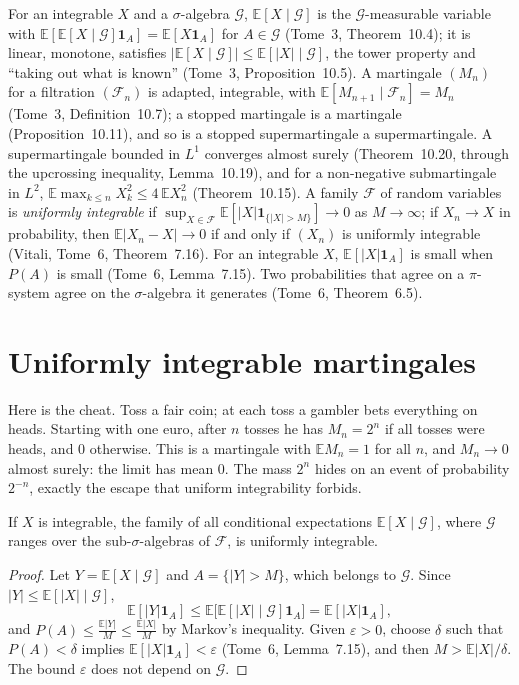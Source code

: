 \begin{reminder}
For an integrable $X$ and a $\sigma$-algebra $\mathcal G$, $\mathbb E[X\mid\mathcal G]$ is the $\mathcal G$-measurable variable with $\mathbb E[\mathbb E[X\mid\mathcal G]\mathbf 1_A]=\mathbb E[X\mathbf 1_A]$ for $A\in\mathcal G$
(Tome~3, Theorem~10.4); it is linear, monotone, satisfies $|\mathbb E[X\mid\mathcal G]|\le\mathbb E[|X|\mid\mathcal G]$, the tower property and ``taking out what is known''
(Tome~3, Proposition~10.5). A martingale $(M_n)$ for a filtration $(\mathcal F_n)$ is adapted, integrable, with $\mathbb E[M_{n+1}\mid\mathcal F_n]=M_n$ (Tome~3, Definition~10.7); a stopped
martingale is a martingale (Proposition~10.11), and so is a stopped supermartingale a supermartingale. A supermartingale bounded in $L^1$ converges almost surely (Theorem~10.20, through the upcrossing
inequality, Lemma~10.19), and for a non-negative submartingale in $L^2$, $\mathbb E\max_{k\le n}X_k^2\le4\,\mathbb EX_n^2$ (Theorem~10.15).
A family $\mathcal F$ of random variables is \emph{uniformly integrable} if $\sup_{X\in\mathcal F}\mathbb E[|X|\mathbf 1_{\{|X|>M\}}]\to0$ as $M\to\infty$; if $X_n\to X$ in probability, then $\mathbb E|X_n-X|\to0$
if and only if $(X_n)$ is uniformly integrable (Vitali, Tome~6, Theorem~7.16). For an integrable $X$, $\mathbb E[|X|\mathbf 1_A]$ is small when $P(A)$ is small (Tome~6, Lemma~7.15).
Two probabilities that agree on a $\pi$-system agree on the $\sigma$-algebra it generates (Tome~6, Theorem~6.5).
\end{reminder}

\section{Uniformly integrable martingales}

Here is the cheat. Toss a fair coin; at each toss a gambler bets everything on heads. Starting with one euro, after $n$ tosses he has $M_n=2^n$ if all tosses were heads, and
$0$ otherwise. This is a martingale with $\mathbb EM_n=1$ for all $n$, and $M_n\to0$ almost surely: the limit has mean $0$. The mass $2^n$ hides on an event of probability $2^{-n}$,
exactly the escape that uniform integrability forbids.

\begin{lemma}\label{lem:condui}
If $X$ is integrable, the family of all conditional expectations $\mathbb E[X\mid\mathcal G]$, where $\mathcal G$ ranges over the sub-$\sigma$-algebras of $\mathcal F$, is uniformly integrable.
\end{lemma}
\begin{proof}
Let $Y=\mathbb E[X\mid\mathcal G]$ and $A=\{|Y|>M\}$, which belongs to $\mathcal G$. Since $|Y|\le\mathbb E[|X|\mid\mathcal G]$,
\[
\mathbb E[|Y|\mathbf 1_A]\le\mathbb E\bigl[\mathbb E[|X|\mid\mathcal G]\mathbf 1_A\bigr]=\mathbb E[|X|\mathbf 1_A],
\]
and $P(A)\le\frac{\mathbb E|Y|}M\le\frac{\mathbb E|X|}M$ by Markov's inequality. Given $\varepsilon>0$, choose $\delta$ such that $P(A)<\delta$ implies $\mathbb E[|X|\mathbf 1_A]<\varepsilon$ (Tome~6, Lemma~7.15), and then
$M>\mathbb E|X|/\delta$. The bound $\varepsilon$ does not depend on $\mathcal G$.
\end{proof}

